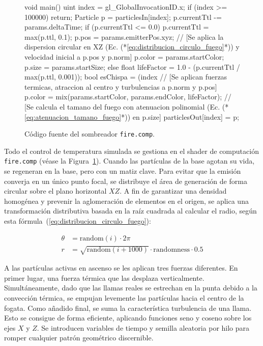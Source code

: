 \begin{figure}[!htbp]
    \centering
\begin{carbonbox}
void main() {
    uint index = gl_GlobalInvocationID.x; 
    if (index >= 100000) return;
    Particle p = particlesIn[index];
    p.currentTtl -= params.deltaTime;
    if (p.currentTtl <= 0.0) {
        p.currentTtl = max(p.ttl, 0.1); 
        p.pos = params.emitterPos.xyz;
        // [Se aplica la dispersion circular en XZ (Ec. (*\ref{eq:distribucion_circulo_fuego}*)) y velocidad inicial a p.pos y p.norm]
        p.color = params.startColor;
        p.size = params.startSize;
    } else {
        float lifeFactor = 1.0 - (p.currentTtl / max(p.ttl, 0.001));
        bool esChispa = (index %
        // [Se aplican fuerzas termicas, atraccion al centro y turbulencias a p.norm y p.pos]
        p.color = mix(params.startColor, params.endColor, lifeFactor);
        // [Se calcula el tamano del fuego con atenuacion polinomial (Ec. (*\ref{eq:atenuacion_tamano_fuego}*)) en p.size]
    }
    particlesOut[index] = p;
}
\end{carbonbox}
    \caption{Código fuente del sombreador \texttt{fire.comp}.}
    \label{fig:fire_comp}
\end{figure}


Todo el control de temperatura simulada se gestiona en el shader de computación \texttt{fire.comp} (véase la Figura~\ref{fig:fire_comp}). Cuando las partículas de la base agotan su vida, se regeneran en la base, pero con un matiz clave. 
Para evitar que la emisión converja en un único punto focal, se distribuye el área de generación de forma circular sobre el plano horizontal $XZ$. A fin de garantizar una densidad homogénea y prevenir la aglomeración de elementos en el origen, se aplica una transformación distributiva basada en la raíz cuadrada al calcular el radio, según esta fórmula~(\ref{eq:distribucion_circulo_fuego}):

\begin{equation}
    \label{eq:distribucion_circulo_fuego}
    \begin{aligned}
        \theta &= \text{random}(i) \cdot 2\pi \\
        r &= \sqrt{\text{random}(i + 1000)} \cdot \text{randomness} \cdot 0.5
    \end{aligned}
\end{equation}

A las partículas activas en ascenso se les aplican tres fuerzas diferentes. En primer lugar, una fuerza térmica que las desplaza verticalmente. Simultáneamente, dado que las llamas reales se estrechan en la punta debido a la convección térmica, se empujan levemente las partículas hacia el centro de la fogata. Como añadido final, se suma la característica turbulencia de una llama. Esto se consigue de forma eficiente, aplicando funciones seno y coseno sobre los ejes $X$ y $Z$. Se introducen variables de tiempo y semilla aleatoria por hilo para romper cualquier patrón geométrico discernible.

